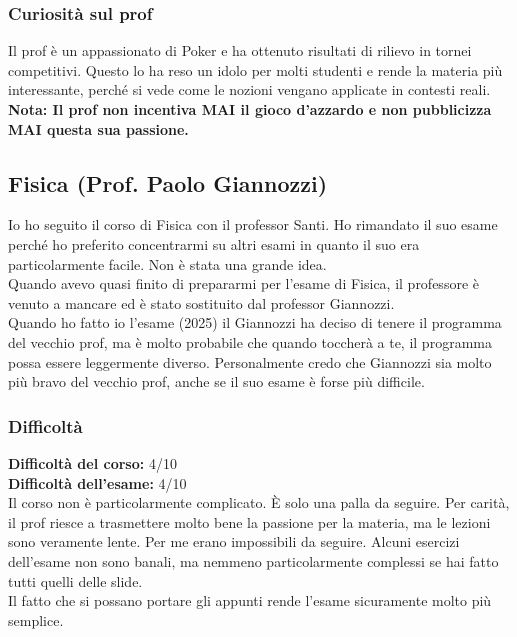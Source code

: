 \documentclass[18pt]{extarticle}
\begin{document}
\subsubsection{Curiosità sul prof}
Il prof è un appassionato di Poker e ha ottenuto risultati di rilievo in tornei competitivi.
Questo lo ha reso un idolo per molti studenti e rende la materia più interessante,
perché si vede come le nozioni vengano applicate in contesti reali.\\
\textbf{Nota: Il prof non incentiva MAI il gioco d'azzardo e non pubblicizza MAI questa sua passione.}

\clearpage




\subsection{Fisica (Prof. Paolo Giannozzi)}
Io ho seguito il corso di Fisica con il professor Santi. Ho rimandato il suo esame perché ho preferito concentrarmi su altri esami in quanto il suo era particolarmente facile. Non è stata una grande idea.\\
Quando avevo quasi finito di prepararmi per l'esame di Fisica, il professore è venuto a mancare ed è stato sostituito dal professor Giannozzi.\\
Quando ho fatto io l'esame (2025) il Giannozzi ha deciso di tenere il programma del vecchio prof, ma è molto probabile che quando toccherà a te, il programma possa essere leggermente diverso. 
Personalmente credo che Giannozzi sia molto più bravo del vecchio prof, anche se il suo esame è forse più difficile.\\


\subsubsection{Difficoltà}
\textbf{Difficoltà del corso:} 4/10\\
\textbf{Difficoltà dell'esame:} 4/10\\
Il corso non è particolarmente complicato. È solo una palla da seguire. Per carità, il prof riesce a trasmettere molto bene la passione per la materia, ma le lezioni sono veramente lente. Per me erano impossibili da seguire. 
Alcuni esercizi dell'esame non sono banali, ma nemmeno particolarmente complessi se hai fatto tutti quelli delle slide.\\
Il fatto che si possano portare gli appunti rende l'esame sicuramente molto più semplice.\\
\end{document}
